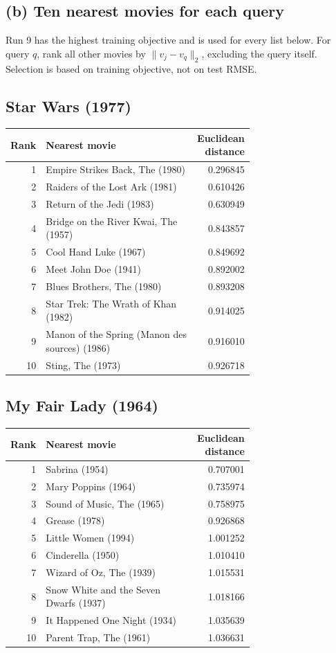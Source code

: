 \documentclass[10pt]{article}
\begin{document}
\clearpage
\subsection*{(b) Ten nearest movies for each query}
Run 9 has the highest training objective and is used for every list
below. For query $q$, rank all other movies by $\|v_j-v_q\|_2$, excluding the
query itself. Selection is based on training objective, not on test RMSE.
\subsection*{Star Wars (1977)}
\begin{center}\small\renewcommand{\arraystretch}{0.96}
\begin{tabular}{r p{0.70\linewidth} r}\toprule
Rank & Nearest movie & Euclidean distance\\\midrule
1 & Empire Strikes Back, The (1980) & 0.296845 \\
2 & Raiders of the Lost Ark (1981) & 0.610426 \\
3 & Return of the Jedi (1983) & 0.630949 \\
4 & Bridge on the River Kwai, The (1957) & 0.843857 \\
5 & Cool Hand Luke (1967) & 0.849692 \\
6 & Meet John Doe (1941) & 0.892002 \\
7 & Blues Brothers, The (1980) & 0.893208 \\
8 & Star Trek: The Wrath of Khan (1982) & 0.914025 \\
9 & Manon of the Spring (Manon des sources) (1986) & 0.916010 \\
10 & Sting, The (1973) & 0.926718 \\
\bottomrule\end{tabular}\end{center}
\subsection*{My Fair Lady (1964)}
\begin{center}\small\renewcommand{\arraystretch}{0.96}
\begin{tabular}{r p{0.70\linewidth} r}\toprule
Rank & Nearest movie & Euclidean distance\\\midrule
1 & Sabrina (1954) & 0.707001 \\
2 & Mary Poppins (1964) & 0.735974 \\
3 & Sound of Music, The (1965) & 0.758975 \\
4 & Grease (1978) & 0.926868 \\
5 & Little Women (1994) & 1.001252 \\
6 & Cinderella (1950) & 1.010410 \\
7 & Wizard of Oz, The (1939) & 1.015531 \\
8 & Snow White and the Seven Dwarfs (1937) & 1.018166 \\
9 & It Happened One Night (1934) & 1.035639 \\
10 & Parent Trap, The (1961) & 1.036631 \\
\bottomrule\end{tabular}\end{center}
\end{document}
